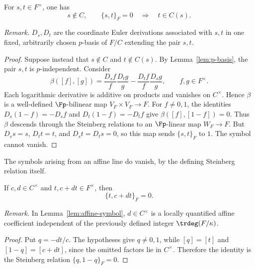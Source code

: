 \begin{lemma}\label{lem:zero-symbol}
For $s,t\in F^\times$, one has
\[
 s\notin C,\qquad \{s,t\}_F=0
 \quad\Longrightarrow\quad t\in C(s).
\]
\end{lemma}

\noindent\textit{Remark.} $D_s,D_t$ are the coordinate Euler derivations associated with $s,t$ in one fixed, arbitrarily chosen $p$-basis of $F/C$ extending the pair $s,t$.


\begin{proof}
Suppose instead that $s\notin C$ and $t\notin C(s)$.  By
Lemma~\ref{lem:p-basis}, the pair $s,t$ is $p$-independent.  Consider
\[
 \beta([f],[g])=
 \frac{D_s f}{f}\frac{D_t g}{g}
 -\frac{D_t f}{f}\frac{D_s g}{g},
 \qquad f,g\in F^\times.
\]
Each logarithmic derivative is additive on products and vanishes on
$C^\times$.  Hence $\beta$ is a well-defined $\Fp$-bilinear map
$V_F\times V_F\to F$.  For $f\ne0,1$, the identities
$D_s(1-f)=-D_s f$ and $D_t(1-f)=-D_t f$ give
$\beta([f],[1-f])=0$.  Thus $\beta$ descends through the Steinberg
relations to an $\Fp$-linear map $W_F\to F$.
But $D_s s=s$, $D_t t=t$, and $D_s t=D_t s=0$, so this map sends
$\{s,t\}_F$ to $1$.  The symbol cannot vanish.
\end{proof}

The symbols arising from an affine line do vanish, by the defining
Steinberg relation itself.

\begin{lemma}\label{lem:affine-symbol}
If $c,d\in C^\times$ and $t,c+dt\in F^\times$, then
\[
 \{t,c+dt\}_F=0.
\]
\end{lemma}

\noindent\textit{Remark.} In Lemma~\ref{lem:affine-symbol}, $d\in C^\times$ is a locally quantified affine coefficient independent of the previously defined integer $\trdeg(F/\kappa)$.


\begin{proof}
Put $q=-dt/c$.  The hypotheses give $q\ne0,1$, while
$[q]=[t]$ and $[1-q]=[c+dt]$, since the omitted factors lie in
$C^\times$.  Therefore the identity is the Steinberg relation
$\{q,1-q\}_F=0$.
\end{proof}

